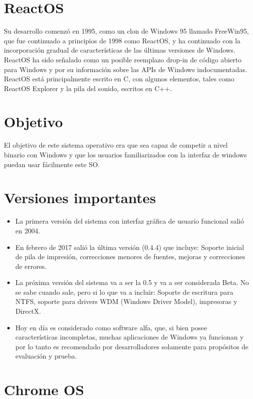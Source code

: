 \section{ReactOS}

 Su desarrollo comenzó en 1995, como un clon de Windows 95 llamado FreeWin95, que fue continuado a principios de 1998 como ReactOS, y ha continuado con la incorporación gradual de características de las últimas versiones de Windows. ReactOS ha sido señalado como un posible reemplazo drop-in de código abierto para Windows y por su información sobre las APIs de Windows indocumentadas.
ReactOS está principalmente escrito en C, con algunos elementos, tales como ReactOS Explorer y la pila del sonido, escritos en C++.

\section{Objetivo}

El objetivo de este sistema operativo era que sea capaz de competir a nivel binario con Windows y que los usuarios familiarizados con la interfaz de windows puedan usar fácilmente este SO.

\section{Versiones importantes}

\begin{itemize}
	\item La primera versión del sistema con interfaz gráfica de usuario funcional salió en 2004.
	\item En febrero de 2017 salió la última versión (0.4.4) que incluye: Soporte inicial de pila de impresión, correcciones menores de fuentes, mejoras y correcciones de errores.
	\item La próxima versión del sistema va a ser la 0.5 y va a ser considerada Beta. No se sabe cuando sale, pero si lo que va a incluir: Soporte de escritura para NTFS, soporte para drivers WDM (Windows Driver Model), impresoras y DirectX.
	\item Hoy en día es considerado como software alfa, que, si bien posee características incompletas, muchas aplicaciones de Windows ya funcionan y por lo tanto es recomendado por desarrolladores solamente para propósitos de evaluación y prueba.
\end{itemize}

\section{Chrome OS}

